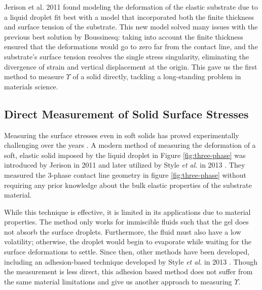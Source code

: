 Jerison et al. 2011 \cite{jerison2011deformation} found modeling the deformation of the elastic substrate due to a liquid droplet fit best with a model that incorporated both the finite thickness and surface tension of the substrate. This new model solved many issues with the previous best solution by Boussinesq: taking into account the finite thickness ensured that the deformations would go to zero far from the contact line, and the substrate's surface tension resolves the single stress singularity, eliminating the divergence of strain and vertical displacement at the origin. This gave us the first method to measure $ \Upsilon $ of a solid directly, tackling a long-standing problem in materials science.


\subsection{Direct Measurement of Solid Surface Stresses}
Measuring the surface stresses even in soft solids has proved experimentally challenging over the years \cite{xu2016surface,jensen2015wetting,mondal2015estimation,style2013surface,jagota2012surface,nadermann2013solid,park2014visualization}. A modern method of measuring the deformation of a soft, elastic solid imposed by the liquid droplet in Figure \ref{fig:three-phase} was introduced by Jerison in 2011 \cite{jerison2011deformation} and later utilized by Style \emph{et al.} in 2013 \cite{style2013universal}. They measured the 3-phase contact line geometry in figure \ref{fig:three-phase} without requiring any prior knowledge about the bulk elastic properties of the substrate material. 

While this technique is effective, it is limited in its applications due to material properties. The method only works for immiscible fluids such that the gel does not absorb the surface droplets. Furthermore, the fluid must also have a low volatility; otherwise, the droplet would begin to evaporate while waiting for the surface deformations to settle. Since then, other methods have been developed, including an adhesion-based technique developed by Style \textit{et al.} in 2013 \cite{style2013surface}. Though the measurement is less direct, this adhesion based method does not suffer from the same material limitations and give us another approach to measuring $ \Upsilon $.  



